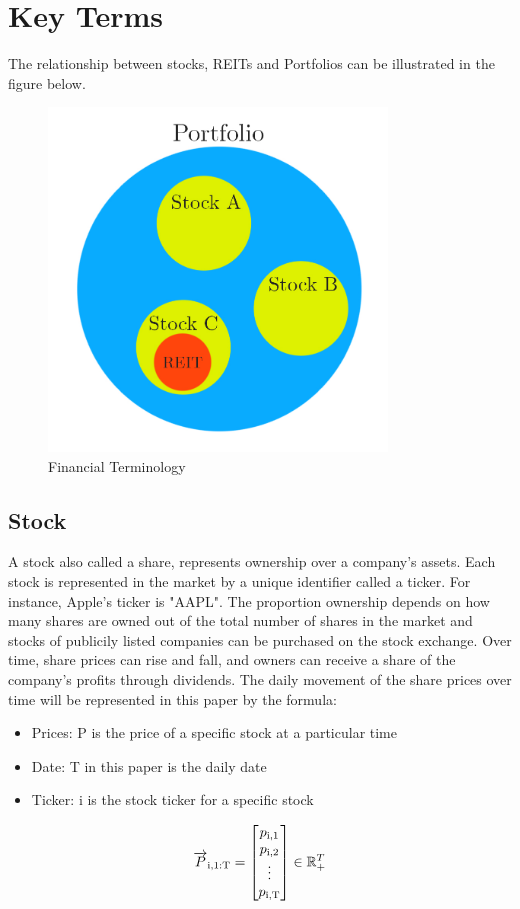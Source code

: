 \documentclass[a4paper,12pt]{report}
\numberwithin{equation}{section}
\theoremstyle{definition}
\begin{document}
\section{Key Terms}
The relationship between stocks, REITs and Portfolios can be illustrated in the figure below.
\begin{figure}[H]
  \centerline{\includegraphics[width=9cm]{Stock_Porfolio_Reit}}
  \caption{Financial Terminology}\label{visina8}
  \label{fig:Stock_Porfolio_Reit}
  \end{figure}
\subsection{Stock}
A stock also called a share, represents ownership over a company's assets. Each stock is represented in the market by a unique identifier called a ticker. For instance, Apple's ticker is "AAPL". The proportion ownership depends on how many shares are owned out of the total number of shares in the market and stocks of publicily listed companies can be purchased on the stock exchange. Over time, share prices can rise and fall, and owners can receive a share of the company's profits through dividends. The daily movement of the share prices over time will be represented in this paper by the formula:

\begin{itemize}

  \item {Prices: P is the price of a specific stock at a particular time}
  \item {Date: T in this paper is the daily date}
  \item {Ticker: i is the stock ticker for a specific stock}
  
\end{itemize}
\begin{equation*}
  \overrightarrow{P}\textsubscript{i,1:T} =  
  \begin{bmatrix}
    p\textsubscript{i,1} \\
    p\textsubscript{i,2} \\
    \vdots \\
    p\textsubscript{i,T} \\
  \end{bmatrix}
  \in \mathbb{R}_+^{T}
\end{equation*}
\end{document}
